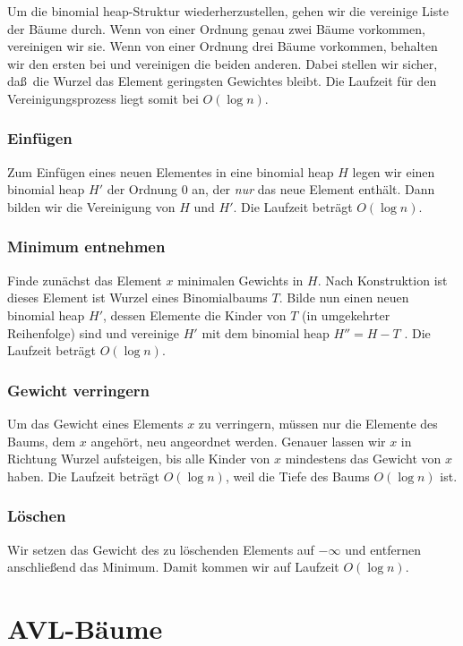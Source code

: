 \documentclass[10pt,reqno]{amsart}
\numberwithin{equation}{section}
\begin{document}
Um die binomial heap-Struktur wiederherzustellen,  gehen wir die vereinige Liste der B\"aume durch.
Wenn von einer Ordnung genau zwei B\"aume vorkommen, vereinigen wir sie.
Wenn von einer Ordnung drei B\"aume vorkommen, behalten wir den ersten bei und vereinigen die beiden anderen.
Dabei stellen wir sicher, da\ss\ die Wurzel das Element geringsten Gewichtes bleibt.
Die Laufzeit f\"ur den Vereinigungsprozess liegt somit bei $O(\log n)$.

\subsubsection{Einf\"ugen}
Zum Einf\"ugen eines neuen Elementes in eine binomial heap $H$ legen wir einen binomial heap $H'$ der Ordnung $0$ an, der \emph{nur} das neue Element enth\"alt.
Dann bilden wir die Vereinigung von $H$ und $H'$.
Die Laufzeit betr\"agt $O(\log n)$.

\subsubsection{Minimum entnehmen}

Finde zun\"achst das Element $x$ minimalen Gewichts in $H$.
Nach Konstruktion ist dieses Element ist Wurzel eines Binomialbaums $T$.
Bilde nun einen neuen binomial heap $H'$, dessen Elemente die Kinder von $T$ (in umgekehrter Reihenfolge) sind und vereinige $H'$ mit dem binomial heap $H''=H-T$ .
Die Laufzeit betr\"agt $O(\log n)$.

\subsubsection{Gewicht verringern}

Um das Gewicht eines Elements $x$ zu verringern, m\"ussen nur die Elemente des Baums, dem $x$ angeh\"ort, neu angeordnet werden.
Genauer lassen wir $x$ in Richtung Wurzel aufsteigen, bis alle Kinder von $x$ mindestens das Gewicht von $x$ haben.
Die Laufzeit betr\"agt $O(\log n)$, weil die Tiefe des Baums $O(\log n)$ ist.

\subsubsection{L\"oschen}
Wir setzen das Gewicht des zu l\"oschenden Elements auf $-\infty$ und entfernen anschlie\ss end das Minimum.
Damit kommen wir auf Laufzeit $O(\log n)$.

\section{AVL-B\"aume}\label{sec_avl}
\end{document}
